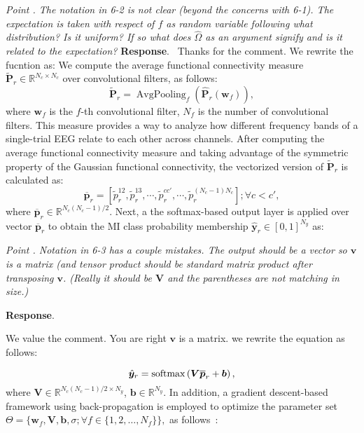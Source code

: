 \documentclass[runningheads]{llncs}
\newcommand{\Real}{\mathbb{R}}
\newcommand{\ve}[1]{\bm {#1}}
\newcommand{\mat}[1]{\bm {#1}}
\newenvironment{reviewer}{\setcounter{pointcounter}{1}}{}
\newcommand{\changes}[1]{\textcolor[rgb]{1.00,0.00,0.00}{#1}}
\newcommand{\point}[1]{\medskip \noindent
 \textsl{{\fontseries{b}\selectfont Point \thepointcounter}.
 \stepcounter{pointcounter} #1}}
\newcommand{\reply}{\medskip \noindent \textbf{Response}.\ }
\begin{document}
\begin{reviewer}
\point{The notation in 6-2 is not clear (beyond the concerns with 6-1). The expectation is taken with respect of $f$ as random variable following what distribution? Is it uniform? If so what does $\hat{\Omega}$ as an argument signify and is it related to the expectation?}
\reply{
    Thanks for the comment. We rewrite the fucntion as:
    \changes{ We compute the average functional connectivity measure $\tilde{\mat{P}}_r \in \Real^{N_c \times N_c}$ over convolutional filters, as follows:
    \begin{equation}
		\tilde{\mat{P}}_r  = \operatorname{AvgPooling}_{f} \left(\hat{\mat{P}}_{r}(\ve{w}_f)\right), \label{eq:lastlayerFC}
	\end{equation}
    where $\ve{w}_f$ is the $f$-th convolutional filter, $N_f$ is the number of convolutional filters. This measure provides a way to analyze how different frequency bands of a single-trial EEG relate to each other across channels. After computing the average functional connectivity measure and taking advantage of the symmetric property of the Gaussian functional connectivity, the vectorized version of $\tilde{\mat{P}}_r$ is calculated as:
    \begin{equation} 
        \overline{\ve{p}}_r = \left[\tilde{p}_r^{12}, \tilde{p}_r^{13}, \cdots, \tilde{p}_r^{cc'}, \cdots, \tilde{p}_r^{(N_c-1) N_c} \right]; \forall c<c',
    \end{equation}
    where $\overline{\ve{p}}_r \in  \Real ^{N_c(N_c-1)/2}$. Next, a the softmax-based output layer is applied over vector $\overline{\ve{p}}_r$ to obtain the MI class probability membership $\hat{\ve{y}}_r \in [0,1]^{N_y}$ as:
    }
}

\point{Notation in 6-3 has a couple mistakes. The output should be a vector so $\mathbf{v}$ is a matrix (and tensor product should be standard matrix product after transposing $\mathbf{v}$. (Really it should be $\mathbf{V}$ and the parentheses are not matching in size.) }

\reply{
    We value the comment. You are right $\mathbf{v}$ is a matrix. we rewrite the equation as follows:

    \changes{
        \begin{equation}\label{eq:output}
            \hat{\ve{y}}_r = {\rm{softmax}}\left(\mat{V}\overline{\ve{p}}_r + \ve{b}\right),
        \end{equation}
        where $\mat{V}\in \Real^{N_c(N_c-1)/2\times N_y}$, $\ve{b} \in \Real^{N_y}$. In addition, a gradient descent-based framework using back-propagation is employed to optimize the parameter set $\Theta=\{\ve{w}_f,\mat{V},\ve{b},\sigma;\forall f\in\{1,2,\dots,N_f\}\},$ as follows~\cite{zhang2021dive}:
        }
}


\end{reviewer}
\end{document}
